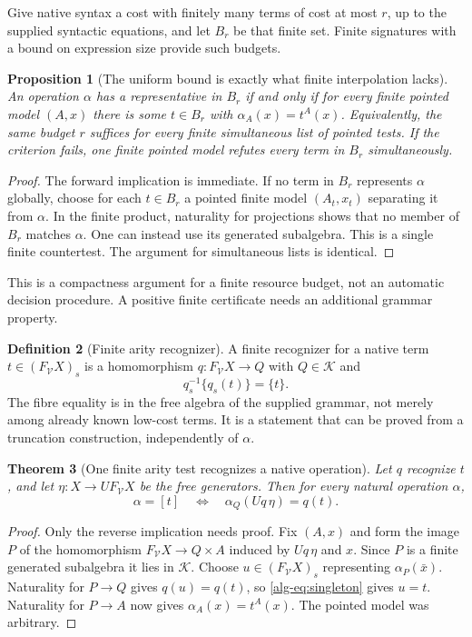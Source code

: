\documentclass[11pt]{article}
\newtheorem{theorem}{Theorem}[section]
\newtheorem{proposition}[theorem]{Proposition}
\theoremstyle{definition}
\newtheorem{definition}[theorem]{Definition}
\theoremstyle{remark}
\begin{document}
Give native syntax a cost with finitely many terms of cost at most $r$,
up to the supplied syntactic equations, and let $B_r$ be that finite set.
Finite signatures with a bound on expression size provide such budgets.

\begin{proposition}[The uniform bound is exactly what finite interpolation
lacks]\label{alg-prop:uniform}
An operation $\alpha$ has a representative in $B_r$ if and only if for
every finite pointed model $(A,x)$ there is some $t\in B_r$ with
$\alpha_A(x)=t^A(x)$. Equivalently, the same budget $r$ suffices for every
finite simultaneous list of pointed tests.
If the criterion fails, one finite pointed model refutes every term in
$B_r$ simultaneously.
\end{proposition}
\begin{proof}
The forward implication is immediate. If no term in $B_r$ represents
$\alpha$ globally, choose for each $t\in B_r$ a pointed finite model
$(A_t,x_t)$ separating it from $\alpha$. In the finite product, naturality
for projections shows that no member of $B_r$ matches $\alpha$.
One can instead use its generated subalgebra. This is a single finite
countertest. The argument for simultaneous lists is identical.
\end{proof}

This is a compactness argument for a finite resource budget, not an
automatic decision procedure. A positive finite certificate needs an
additional grammar property.

\begin{definition}[Finite arity recognizer]
A finite recognizer for a native term $t\in(F_{\mathcal V}X)_s$ is a
homomorphism $q:F_{\mathcal V}X\to Q$ with $Q\in\mathcal K$ and
\begin{equation}\label{alg-eq:singleton}
                    q_s^{-1}\{q_s(t)\}=\{t\}.
\end{equation}
The fibre equality is in the free algebra of the supplied grammar, not
merely among already known low-cost terms. It is a statement that can be
proved from a truncation construction, independently of $\alpha$.
\end{definition}

\begin{theorem}[One finite arity test recognizes a native operation]
\label{alg-thm:recognition}
Let $q$ recognize $t$, and let $\eta:X\to UF_{\mathcal V}X$ be the free
generators. Then for every natural operation $\alpha$,
\[
 \alpha=[t]
 \quad\Longleftrightarrow\quad
 \alpha_Q(Uq\,\eta)=q(t).
\]
\end{theorem}
\begin{proof}
Only the reverse implication needs proof. Fix $(A,x)$ and form the image
$P$ of the homomorphism $F_{\mathcal V}X\to Q\times A$ induced by
$Uq\,\eta$ and $x$. Since $P$ is a finite generated subalgebra it lies
in $\mathcal K$. Choose $u\in(F_{\mathcal V}X)_s$ representing
$\alpha_P(\bar x)$. Naturality for $P\to Q$ gives $q(u)=q(t)$, so
\eqref{alg-eq:singleton} gives $u=t$. Naturality for $P\to A$ now gives
$\alpha_A(x)=t^A(x)$. The pointed model was arbitrary.
\end{proof}
\end{document}
